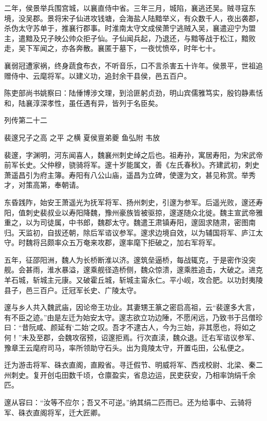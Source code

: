 \documentclass[12pt,UTF8]{ctexbook}
\begin{document}
二年，侯景举兵围宫城，以襄直侍中省。三年三月，城陷，襄逃还吴。贼寻寇东境，没吴郡。景将宋子仙进攻钱塘，会海盐人陆黯举义，有众数千人，夜出袭郡，杀伪太守苏单于，推襄行郡事。时淮南太守文成侯萧宁逃贼入吴，襄遣迎宁为盟主，遣黯及兄子映公帅众拒子仙。子仙闻兵起，乃退还，与黯等战于松江，黯败走，吴下军闻之，亦各奔散。襄匿于墓下，一夜忧愤卒，时年七十。

襄弱冠遭家祸，终身蔬食布衣，不听音乐，口不言杀害五十许年。侯景平，世祖追赠侍中、云麾将军。以建义功，追封余干县侯，邑五百户。

陈吏部尚书姚察曰：陆倕博涉文理，到洽匪躬贞劲，明山宾儒雅笃实，殷钧静素恬和，陆襄淳深孝性，虽任遇有异，皆列于名臣矣。





列传第二十二

裴邃兄子之高 之平 之横 夏侯亶弟夔 鱼弘附 韦放

裴邃，字渊明，河东闻喜人，魏襄州刺史绰之后也。祖寿孙，寓居寿阳，为宋武帝前军长史。父仲穆，骁骑将军。邃十岁能属文，善《左氏春秋》。齐建武初，刺史萧遥昌引为府主簿。寿阳有八公山庙，遥昌为立碑，使邃为文，甚见称赏。举秀才，对策高第，奉朝请。

东昏践阼，始安王萧遥光为抚军将军、扬州刺史，引邃为参军。后遥光败，邃还寿阳，值刺史裴叔业以寿阳降魏，豫州豪族皆被驱掠，邃遂随众北徙。魏主宣武帝雅重之，以为司徒属，中书郎，魏郡太守。魏遣王肃镇寿阳，邃固求随肃，密图南归。天监初，自拔还朝，除后军谘议参军。邃求边境自效，以为辅国将军、庐江太守。时魏将吕颇率众五万奄来攻郡，邃率麾下拒破之，加右军将军。

五年，征邵阳洲，魏人为长桥断淮以济。邃筑垒逼桥，每战辄克，于是密作没突舰。会甚雨，淮水暴溢，邃乘舰径造桥侧，魏众惊溃，邃乘胜追击，大破之。进克羊石城，斩城主元康。又破霍丘城，斩城主甯永仁。平小岘，攻合肥。以功封夷陵县子，邑三百户。迁冠军长史、广陵太守。

邃与乡人共入魏武庙，因论帝王功业。其妻甥王篆之密启高祖，云“裴邃多大言，有不臣之迹。”由是左迁为始安太守。邃志欲立功边陲，不愿闲远，乃致书于吕僧珍曰：“昔阮咸、颜延有‘二始’之叹。吾才不逮古人，今为三始，非其愿也，将如之何！”未及至郡，会魏攻宿预，诏邃拒焉。行次直渎，魏众退。迁右军谘议参军、豫章王云麾府司马，率所领助守石头。出为竟陵太守，开置屯田，公私便之。

迁为游击将军、硃衣直阁，直殿省。寻迁假节、明威将军、西戎校尉、北梁、秦二州刺史。复开创屯田数千顷，仓廪盈实，省息边运，民吏获安，乃相率饷绢千余匹。

邃从容曰：“汝等不应尔；吾又不可逆。”纳其绢二匹而已。还为给事中、云骑将军、硃衣直阁将军，迁大匠卿。
\end{document}
